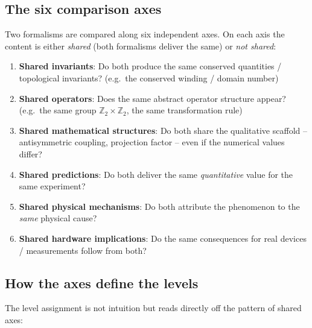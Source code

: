 \subsection{The six comparison axes}

Two formalisms are compared along six independent axes. On each axis the
content is either \emph{shared} (both formalisms deliver the same) or
\emph{not shared}:

\begin{enumerate}
  \item \textbf{Shared invariants}: Do both produce the same conserved
        quantities / topological invariants?
        (e.g.\ the conserved winding / domain number)
  \item \textbf{Shared operators}: Does the same abstract operator
        structure appear? (e.g.\ the same group
        $\mathbb{Z}_2\times\mathbb{Z}_2$, the same transformation rule)
  \item \textbf{Shared mathematical structures}: Do both share the
        qualitative scaffold -- antisymmetric coupling, projection factor --
        even if the numerical values differ?
  \item \textbf{Shared predictions}: Do both deliver the same
        \emph{quantitative} value for the same experiment?
  \item \textbf{Shared physical mechanisms}: Do both attribute the
        phenomenon to the \emph{same} physical cause?
  \item \textbf{Shared hardware implications}: Do the same consequences
        for real devices / measurements follow from both?
\end{enumerate}

\subsection{How the axes define the levels}

The level assignment is not intuition but reads directly off the pattern
of shared axes:

